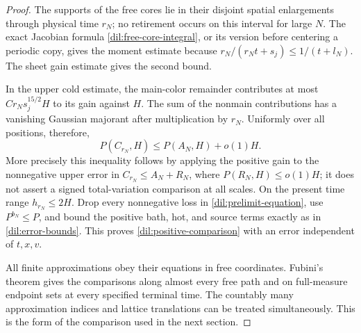 \begin{proof}
The supports of the free cores lie in their disjoint spatial
enlargements through physical time \(r_N\); no retirement occurs
on this interval for large \(N\). The exact Jacobian formula
\eqref{dil:free-core-integral}, or its version before centering a
periodic copy, gives the moment estimate because
\(r_N/(r_Nt+s_j)\le1/(t+l_N)\). The sheet gain estimate gives
the second bound.

In the upper cold estimate, the main-color remainder contributes at
most \(C r_Ns_j^{15/2}H\) to its gain against \(H\).
The sum of the nonmain contributions has a vanishing Gaussian
majorant after multiplication by \(r_N\). Uniformly over all
positions, therefore,
\[
 P(C_{r_N},H)\le P(A_N,H)+o(1)H.
\]
More precisely this inequality follows by applying the positive gain
to the nonnegative upper error in \(C_{r_N}\le A_N+R_N\), where
\(P(R_N,H)\le o(1)H\); it does not assert a signed total-variation
comparison at all scales. On the present time range
\(h_{r_N}\le2H\). Drop every nonnegative loss in
\eqref{dil:prelimit-equation}, use \(P^{b_N}\le P\), and bound the
positive bath, hot, and source terms exactly as in
\eqref{dil:error-bounds}. This proves
\eqref{dil:positive-comparison} with an error independent of
\(t,x,v\).

All finite approximations obey their equations in free coordinates.
Fubini's theorem gives the comparisons along almost every free path
and on full-measure endpoint sets at every specified terminal time.
The countably many approximation indices and lattice translations
can be treated simultaneously. This is the form of the comparison
used in the next section.
\end{proof}
